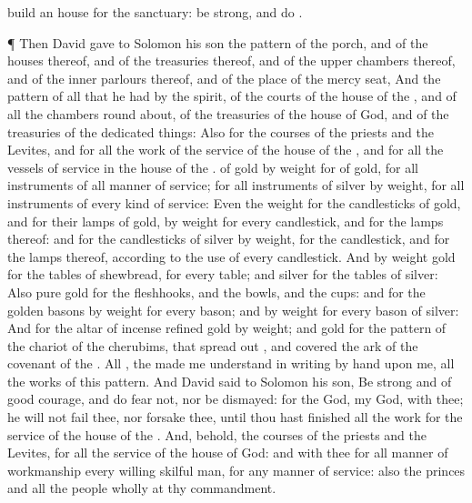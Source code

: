 {build an
house for the
sanctuary: be
strong, and
do
{}.
\par }{\PP {}¶ Then
David
gave to
Solomon his
son the
pattern of the
porch, and of the
houses thereof, and of the
treasuries thereof, and of the upper
chambers thereof, and of the
inner
parlours thereof, and of the
place of the mercy
seat,
And the
pattern of all that he had by the
spirit, of the
courts of the
house of the
{}, and of all the
chambers round
about, of the
treasuries of the
house of
God, and of the
treasuries of the dedicated
things:
Also for the
courses of the
priests and the
Levites, and for all the
work of the
service of the
house of the
{}, and for all the
vessels of
service in the
house of the
{}.
 of
gold by
weight for
{} of
gold, for all
instruments of all manner of
service;
{} for all
instruments of
silver by
weight, for all
instruments of every kind of
service:
Even the
weight for the
candlesticks of
gold, and for their
lamps of
gold, by
weight for every
candlestick, and for the
lamps thereof: and for the
candlesticks of
silver by
weight,
{} for the
candlestick, and
{} for the
lamps thereof, according to the
use of every
candlestick.
And by
weight
{}
gold for the
tables of
shewbread, for every
table; and
{}
silver for the
tables of
silver:
Also
pure
gold for the
fleshhooks, and the
bowls, and the
cups: and for the
golden
basons
{} by
weight for every
bason; and
{} by
weight for every
bason of
silver:
And for the
altar of
incense
refined
gold by
weight; and
gold for the
pattern of the
chariot of the
cherubims, that spread
out
{}, and
covered the
ark of the
covenant of the
{}.
All
{}, the
{} made me
understand in
writing by
{}
hand upon me,
{} all the
works of this
pattern.
And
David
said to
Solomon his
son, Be
strong and of good
courage, and
do
{}
fear not, nor be
dismayed: for the
{}
God,
{} my
God,
{} with thee; he will not
fail thee, nor
forsake thee, until thou hast
finished all the
work for the
service of the
house of the
{}.
And, behold, the
courses of the
priests and the
Levites,
{} for all the
service of the
house of
God: and
{} with thee for all manner of
workmanship every
willing skilful
man, for any manner of
service: also the
princes and all the
people
{} wholly at thy
commandment.

}
